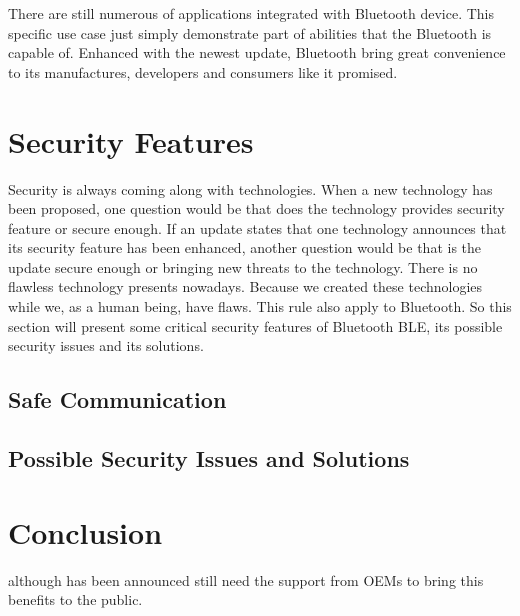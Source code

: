 \documentclass{cseminar}
\begin{document}
There are still numerous of applications integrated with Bluetooth device. This specific use case just simply demonstrate part of abilities that the Bluetooth is capable of. Enhanced with the newest update, Bluetooth bring great convenience to its manufactures, developers and consumers like it promised.
\section{Security Features}
Security is always coming along with technologies. When a new technology has been proposed, one question would be that does the technology provides security feature or secure enough. If an update states that one technology announces that its security feature has been enhanced, another question would be that is the update secure enough or bringing new threats to the technology. There is no flawless technology presents nowadays. Because we created these technologies while we, as a human being, have flaws. This rule also apply to Bluetooth. So this section will present some critical security features of Bluetooth BLE, its possible security issues and its solutions.
\subsection{Safe Communication}

\subsection{Possible Security Issues and Solutions}
\section{Conclusion}
although has been announced still need the support from OEMs to bring this benefits to the public.




\end{document}
